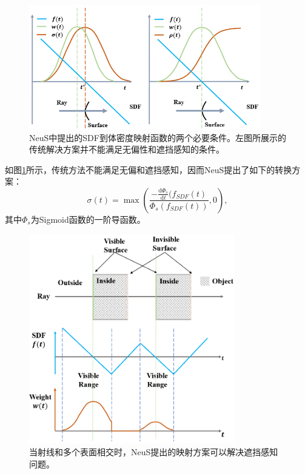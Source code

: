 \begin{figure}[ht]
    \centering
    \includegraphics[width=0.9\textwidth]{undergraduate-thesis/images/related-work/neus conditions.png}
    \caption{NeuS\cite{wang_neus_2021}中提出的SDF到体密度映射函数的两个必要条件。左图所展示的传统解决方案并不能满足无偏性和遮挡感知的条件。}
    \label{fig: related-work neus conditions}
\end{figure}

如图\ref{fig: related-work neus conditions}所示，传统方法不能满足无偏和遮挡感知，因而NeuS提出了如下的转换方案：
\begin{equation}
    \sigma(t) = \max\left(\frac{-\frac{\text{d}\Phi_s}{\text{d}t}(f_{SDF}(t)}{\Phi_s(f_{SDF}(t))}, 0\right),
    \label{eq: related-work neus function}
\end{equation}
其中$\Phi_s$为Sigmoid函数的一阶导函数。

\begin{figure}[ht]
    \centering
    \includegraphics[width=0.8\textwidth]{undergraduate-thesis/images/related-work/neus multiple-surfaces.png}
    \caption{当射线和多个表面相交时，NeuS\cite{wang_neus_2021}提出的映射方案可以解决遮挡感知问题。}
    \label{fig:related-work occlusion-aware}
\end{figure}

